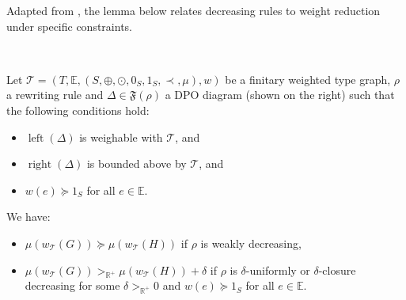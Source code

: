 Adapted from \cite[Theorem C.3]{endrullis2024generalized_arxiv_v2}, the lemma below relates decreasing rules to weight reduction under specific constraints. 
\begin{lemma}
    \label{nwf:lem:decreasing_step}
\ \newline
\begin{minipage}{0.7\textwidth}
    Let $\mathcal{T} = (T,\mathbb{E}, (S, \oplus, \odot, 0_S, 1_S, \prec, \mu), w)$ be a finitary weighted type graph, $\rho$ a rewriting rule and $\Delta \in \mathfrak{F}(\rho)$ a DPO diagram
    (shown on the right)   such that the following conditions hold:
\end{minipage}  
\begin{minipage}{0.3\textwidth}
    \begin{center}
      \end{center}
\end{minipage}
   \begin{itemize}
       \item $\operatorname{left}(\Delta)$ is weighable with \(\mathcal{T}\), and
       \item $\operatorname{right}(\Delta)$ is bounded above by \(\mathcal{T}\), and
       \item $w(e) \succeq 1_S$ for all $e \in \mathbb{E}$.
   \end{itemize}

   \noindent
  We have:
   \begin{itemize}
       \item $\mu(w_\mathcal{T}(G)) \succeq \mu(w_\mathcal{T}(H))$ if $\rho$ is weakly decreasing,
       \item $\mu(w_\mathcal{T}(G)) >_{\mathbb{R}^+} \mu(w_\mathcal{T}(H)) + \delta$ if $\rho$ is $\delta$-uniformly or $\delta$-closure decreasing for some $\delta >_{\mathbb{R}^+} 0$ and $w(e) \succeq 1_S$ for all $e \in \mathbb{E}$.
   \end{itemize}
\end{lemma} 

